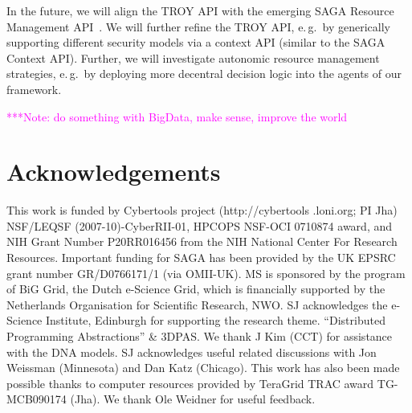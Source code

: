 \documentclass[conference,final]{IEEEtran}
\newcommand{\note}[1]{ {\textcolor{magenta} { ***Note: #1 }}}
\newcommand{\note}[1]{}
\newcommand{\upp}{\vspace*{-0.5em}}
\begin{document}

In the future, we will align the TROY API with the emerging SAGA
Resource Management API~\cite{saga_rm}. We will further refine the
TROY API, e.\,g.\ by generically supporting different security models
via a context API (similar to the SAGA Context API). Further, we will
investigate autonomic resource management strategies, e.\,g.\ by
deploying more decentral decision logic into the agents of our
framework.

\note{do something with BigData, make sense, improve the world}

\section*{Acknowledgements\upp\upp}
\footnotesize{This work is funded by Cybertools project
  (http://cybertools .loni.org; PI Jha) NSF/LEQSF
  (2007-10)-CyberRII-01, HPCOPS NSF-OCI 0710874 award, and NIH Grant
  Number P20RR016456 from the NIH National Center For Research
  Resources. Important funding for SAGA has been provided by the UK
  EPSRC grant number GR/D0766171/1 (via OMII-UK).  MS is sponsored by
  the program of BiG Grid, the Dutch e-Science Grid, which is
  financially supported by the Netherlands Organisation for Scientific
  Research, NWO. SJ acknowledges the e-Science Institute, Edinburgh
  for supporting the research theme. ``Distributed Programming
  Abstractions'' \& 3DPAS. We thank J Kim (CCT) for assistance with
  the DNA models.  SJ acknowledges useful related discussions with Jon
  Weissman (Minnesota) and Dan Katz (Chicago). This work has also been
  made possible thanks to computer resources provided by TeraGrid TRAC
  award TG-MCB090174 (Jha). We thank Ole Weidner for useful feedback.}


\end{document}
